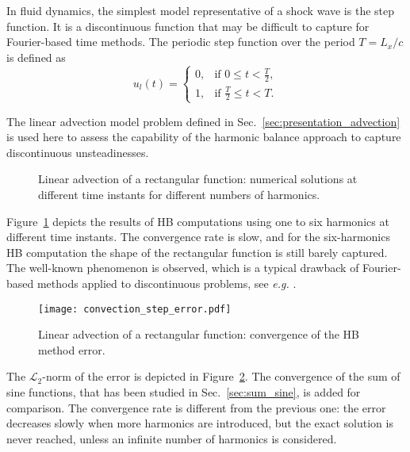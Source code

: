 
In fluid dynamics, the simplest model 
representative of a shock wave
is the step function. It is a discontinuous function
that may be difficult to capture for Fourier-based time methods.
The periodic step function over the period $T=L_x/c$ is defined as
\begin{equation}
    u_l(t) = 
    \begin{cases}
        0, & \text{if } 0 \leq t < \frac{T}{2}, \\
        1, & \text{if } \frac{T}{2} \leq t < T.
    \end{cases}
    \label{eq:inject_step}
\end{equation}

The linear advection model problem defined in 
Sec.~\ref{sec:presentation_advection} is used here to assess
the capability of the harmonic balance approach to capture
discontinuous unsteadinesses.

\begin{figure}[htp]
  \centering
  \caption{Linear advection of a rectangular function: 
  numerical solutions at different time instants for different numbers of harmonics.}
  \label{fig:inj_step_results}
\end{figure}
Figure~\ref{fig:inj_step_results} depicts the results of HB computations
using one to six harmonics at different time instants. The convergence rate 
is slow, and for the six-harmonics HB computation the
shape of the rectangular function is still barely captured. 
The well-known \citet{Gibbs1899}
phenomenon is observed, which is a typical drawback 
of Fourier-based methods applied to discontinuous problems, 
see \emph{e.g.} \citet{Canuto2006}.

\begin{figure}[htp]
  \centering
  \texttt{[image: convection\_step\_error.pdf]}
  \caption{Linear advection of a rectangular function: convergence of the HB method error.}
  \label{fig:conv_step}
\end{figure}
The $\mathcal{L}_2$-norm 
of the error is depicted in Figure~\ref{fig:conv_step}. 
The convergence of the sum of sine functions, 
that has been studied in Sec.~\ref{sec:sum_sine},
is added for comparison.
The convergence rate is different from the previous one: 
the error decreases slowly when more harmonics are introduced, 
but the exact solution is never reached, 
unless an infinite number of harmonics is considered.

